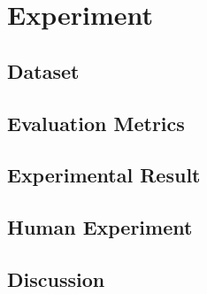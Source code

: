 \chapter{Experiment}

\section{Dataset}
\section{Evaluation Metrics}   %
\section{Experimental Result}  
\section{Human Experiment} %
\section{Discussion}

